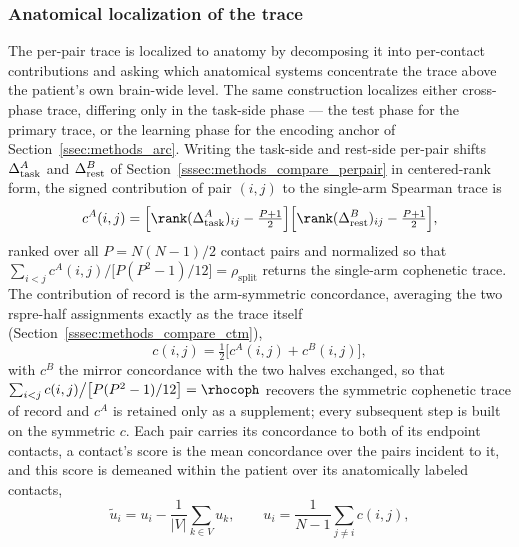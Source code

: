 \subsubsection{Anatomical localization of the trace}
\label{sssec:methods_anatomy}

The per-pair trace is localized to anatomy by decomposing it into per-contact contributions and asking which anatomical systems concentrate the trace above the patient's own brain-wide level. The same construction localizes either cross-phase trace, differing only in the task-side phase --- the test phase for the primary trace, or the learning phase for the encoding anchor of Section~\ref{ssec:methods_arc}. Writing the task-side and rest-side per-pair shifts \(\Delta_{\rm task}^{A}\) and \(\Delta_{\rm rest}^{B}\) of Section~\ref{sssec:methods_compare_perpair} in centered-rank form, the signed contribution of pair \((i,j)\) to the single-arm Spearman trace is
\begin{equation}
    c^{A}(i,j) = \Big[\rank(\Delta_{\rm task}^{A})_{ij} - \tfrac{P+1}{2}\Big]\Big[\rank(\Delta_{\rm rest}^{B})_{ij} - \tfrac{P+1}{2}\Big],
    \label{eq:methods_anat_concordance}
\end{equation}
ranked over all \(P = N(N-1)/2\) contact pairs and normalized so that \(\sum_{i<j} c^{A}(i,j)\big/\big[P(P^{2}-1)/12\big] = \rho_{\mathrm{split}}\) returns the single-arm cophenetic trace. The contribution of record is the arm-symmetric concordance, averaging the two \acrshort{rspre}-half assignments exactly as the trace itself (Section~\ref{sssec:methods_compare_ctm}),
\begin{equation}
    c(i,j) = \tfrac{1}{2}\Big[c^{A}(i,j) + c^{B}(i,j)\Big],
    \label{eq:methods_anat_sym}
\end{equation}
with \(c^{B}\) the mirror concordance with the two halves exchanged, so that \(\sum_{i<j} c(i,j)\big/\big[P(P^{2}-1)/12\big] = \rhocoph\) recovers the symmetric cophenetic trace of record and \(c^{A}\) is retained only as a supplement; every subsequent step is built on the symmetric \(c\). Each pair carries its concordance to both of its endpoint contacts, a contact's score is the mean concordance over the pairs incident to it, and this score is demeaned within the patient over its anatomically labeled contacts,
\begin{equation}
    \tilde{u}_{i} = u_{i} - \frac{1}{|V|}\sum_{k \in V} u_{k}, \qquad u_{i} = \frac{1}{N-1}\sum_{j \neq i} c(i,j),
    \label{eq:methods_anat_node}
\end{equation}
